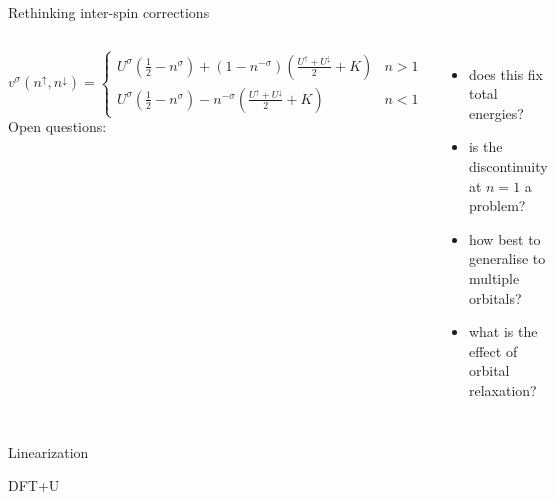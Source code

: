 \documentclass[xcolor=table,aspectratio=169]{beamer}
\numberwithin{equation}{section}
\begin{document}
\begin{frame}{Rethinking inter-spin corrections}
\begin{columns}
        \begin{equation}
            v^\sigma(n^\uparrow, n^\downarrow) =
            \begin{cases}
                {U^\sigma}
                \left(\frac{1}{2} - n^\sigma\right)
                +
                \left(
                1 - n^{-\sigma}
                \right)
                \left(
                \frac{U^\uparrow + U^\downarrow}{2}
                +K
                \right)
                 & n > 1 \\
                U^\sigma
                \left(
                \frac{1}{2}
                -n^{\sigma}
                \right)
                - n^{-\sigma}
                \left(
                \frac{U^\uparrow + U^\downarrow}{2}
                + K
                \right)
                 & n < 1
            \end{cases}
            \label{eqn:the_combined_potential}
        \end{equation}
        Open questions:
        \begin{itemize}
            \item does this fix total energies?
            \item is the discontinuity at $n=1$ a problem?
            \item how best to generalise to multiple orbitals?
            \item what is the effect of orbital relaxation?
        \end{itemize}
    \end{columns}
\end{frame}

\begin{frame}{Linearization}

\end{frame}

\begin{frame}{DFT+U}

\end{frame}
\end{document}
